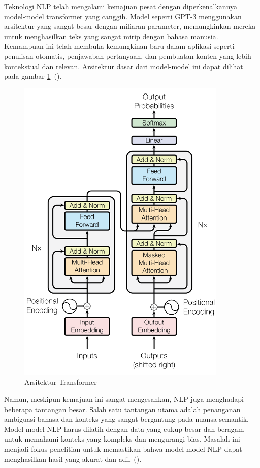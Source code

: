 Teknologi NLP telah mengalami kemajuan pesat dengan diperkenalkannya model-model transformer yang canggih. Model seperti GPT-3 menggunakan arsitektur yang sangat besar dengan miliaran parameter, memungkinkan mereka untuk menghasilkan teks yang sangat mirip dengan bahasa manusia. Kemampuan ini telah membuka kemungkinan baru dalam aplikasi seperti penulisan otomatis, penjawaban pertanyaan, dan pembuatan konten yang lebih kontekstual dan relevan. Arsitektur dasar dari model-model ini dapat dilihat 
pada gambar \ref{fig:transformerArsitektur}~(\cite{devlin2019}).

\begin{figure}[H]
  \centering
  \includegraphics[scale=1.3]{gambar/TransformerArsitektur.png}
  \caption{Arsitektur Transformer}
  \label{fig:transformerArsitektur}
\end{figure}

Namun, meskipun kemajuan ini sangat mengesankan, NLP juga menghadapi beberapa tantangan besar. Salah satu tantangan utama adalah penanganan ambiguasi bahasa dan konteks yang sangat bergantung pada nuansa semantik. Model-model NLP harus dilatih dengan data yang cukup besar dan beragam untuk memahami konteks yang kompleks dan mengurangi bias. Masalah ini menjadi fokus penelitian untuk memastikan bahwa model-model NLP dapat menghasilkan hasil yang akurat dan adil~(\cite{brown2020}).

